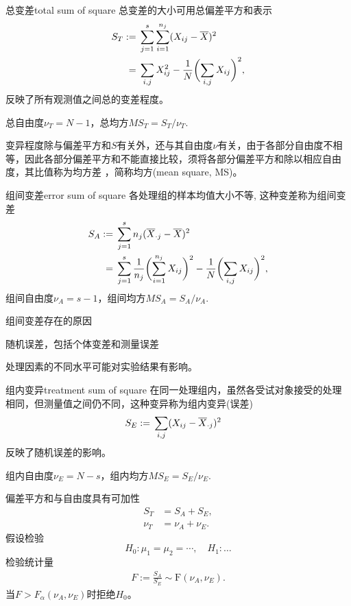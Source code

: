\begin{definition}{总变差}{total sum of square}
	总变差的大小可用总偏差平方和表示
	\begin{align}
		S_T:={}&\sum_{j=1}^s\sum_{i=1}^{n_j}(X_{ij}-\overline X)^2\\\notag
		={}&\sum_{i,j}X_{ij}^2-\frac1N\biggl(\sum_{i,j}X_{ij}\biggr)^2,
	\end{align}
	反映了所有观测值之间总的变差程度。

	总自由度$\nu_T=N-1$，总均方$MS_T=S_T/\nu_T.$
\end{definition}
变异程度除与偏差平方和$S$有关外，还与其自由度$\nu$有关，由于各部分自由度不相等，因此各部分偏差平方和不能直接比较，须将各部分偏差平方和除以相应自由度，其比值称为均方差 ，简称均方(mean square, MS)。
\begin{definition}{组间变差}{error sum of square}
	各处理组的样本均值大小不等, 这种变差称为组间变差%
	\begin{align}
		S_A:={}&\sum_{j=1}^sn_j(\overline X_{\cdot j}-\overline X)^2\\\notag
		={}&\sum_{j=1}^s\frac1{n_j}\biggl(\sum_{i=1}^{n_j}X_{ij}\biggr)^2-\frac1N\biggl(\sum_{i,j}X_{ij}\biggr)^2,
	\end{align}
	组间自由度$\nu_A=s-1$，组间均方$MS_A=S_A/\nu_A.$
\end{definition}
组间变差存在的原因
\begin{compactitem}
	\item 随机误差，包括个体变差和测量误差
	\item 处理因素的不同水平可能对实验结果有影响。
\end{compactitem}
\begin{definition}{组内变异}{treatment sum of square}
	在同一处理组内，虽然各受试对象接受的处理相同，但测量值之间仍不同，这种变异称为组内变异(误差)
	\begin{align}
		S_E:={}&\sum_{i,j}(X_{ij}-\avg X_{\cdot j})^2%
	\end{align}
	反映了随机误差的影响。

	组内自由度$\nu_E=N-s$，组内均方$MS_E=S_E/\nu_E.$
\end{definition}
偏差平方和与自由度具有可加性
\begin{align*}
	S_T&=S_A+S_E,\\
	\nu_T&=\nu_A+\nu_E.
\end{align*}
假设检验
\[
	H_0:\mu_1=\mu_2=\cdots,\quad H_1:\ldots
\]
检验统计量 
\begin{align}
	F:=\frac{S_A}{S_E}\sim\mathrm F(\nu_A,\nu_E).
\end{align}
当$F>F_\alpha(\nu_A,\nu_E)$时拒绝$H_0$。
